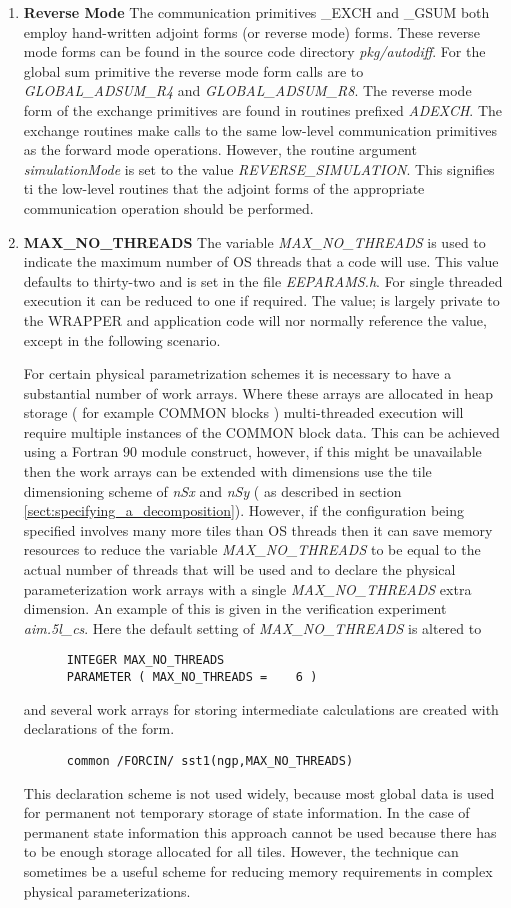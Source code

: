 \begin{enumerate}
\item {\bf Reverse Mode}
The communication primitives \_EXCH and \_GSUM both employ 
hand-written adjoint forms (or reverse mode) forms. 
These reverse mode forms can be found in the
source code directory {\em pkg/autodiff}.
For the global sum primitive the reverse mode form
calls are to {\em GLOBAL\_ADSUM\_R4} and
{\em GLOBAL\_ADSUM\_R8}. The reverse mode form of the
exchange primitives are found in routines
prefixed {\em ADEXCH}. The exchange routines make calls to
the same low-level communication primitives as the forward mode
operations. However, the routine argument {\em simulationMode}
is set to the value {\em REVERSE\_SIMULATION}. This signifies 
ti the low-level routines that the adjoint forms of the
appropriate communication operation should be performed.
\item {\bf MAX\_NO\_THREADS}
The variable {\em MAX\_NO\_THREADS} is used to indicate the
maximum number of OS threads that a code will use. This
value defaults to thirty-two and is set in the file {\em EEPARAMS.h}.
For single threaded execution it can be reduced to one if required.
The value; is largely private to the WRAPPER and application code
will nor normally reference the value, except in the following scenario.

For certain physical parametrization schemes it is necessary to have 
a substantial number of work arrays. Where these arrays are allocated
in heap storage ( for example COMMON blocks ) multi-threaded
execution will require multiple instances of the COMMON block data.
This can be achieved using a Fortran 90 module construct, however,
if this might be unavailable then the work arrays can be extended
with dimensions use the tile dimensioning scheme of {\em nSx}
and {\em nSy} ( as described in section 
\ref{sect:specifying_a_decomposition}). However, if the configuration
being specified involves many more tiles than OS threads then
it can save memory resources to reduce the variable
{\em MAX\_NO\_THREADS} to be equal to the actual number of threads that
will be used and to declare the physical parameterization
work arrays with a single {\em MAX\_NO\_THREADS} extra dimension.
An example of this is given in the verification experiment
{\em aim.5l\_cs}. Here the default setting of 
{\em MAX\_NO\_THREADS} is altered to
\begin{verbatim}
      INTEGER MAX_NO_THREADS
      PARAMETER ( MAX_NO_THREADS =    6 )
\end{verbatim}
and several work arrays for storing intermediate calculations are
created with declarations of the form.
\begin{verbatim}
      common /FORCIN/ sst1(ngp,MAX_NO_THREADS)
\end{verbatim}
This declaration scheme is not used widely, because most global data
is used for permanent not temporary storage of state information.
In the case of permanent state information this approach cannot be used
because there has to be enough storage allocated for all tiles.
However, the technique can sometimes be a useful scheme for reducing memory 
requirements in complex physical parameterizations.
\end{enumerate}

